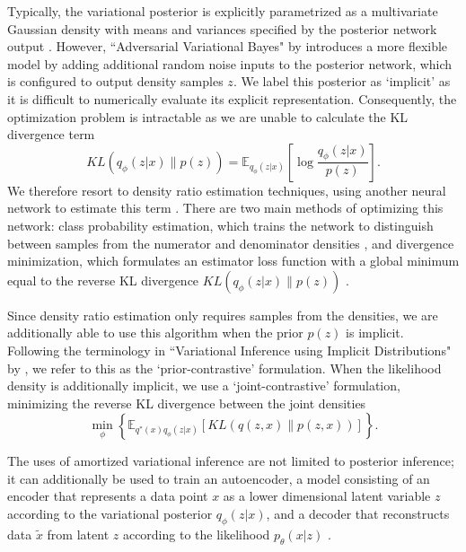 \documentclass[honours,12pt, twoside]{unswthesis}
\newcommand{\E}{\mathbb{E}}
\numberwithin{equation}{section}
\theoremstyle{definition}
\begin{document}
Typically, the variational posterior is explicitly parametrized as a multivariate Gaussian density with means and variances specified by the posterior network output \citep{kingma}. However, ``Adversarial Variational Bayes" by \citet{mescheder} introduces a more flexible model by adding additional random noise inputs to the posterior network, which is configured to output density samples $z$. We label this posterior as `implicit' as it is difficult to numerically evaluate its explicit representation. Consequently, the optimization problem is intractable as we are unable to calculate the KL divergence term\[KL(q_\phi(z|x)\|p(z))=\E_{q_\phi(z|x)}\left[\log \frac{q_\phi(z|x)}{p(z)}\right].\] We therefore resort to density ratio estimation techniques, using another neural network to estimate this term \citep{sugiyama, mohamed}. There are two main methods of optimizing this network: class probability estimation, which trains the network to distinguish between samples from the numerator and denominator densities \citep{gan}, and divergence minimization, which formulates an estimator loss function with a global minimum equal to the reverse KL divergence $KL(q_\phi(z|x)\|p(z))$ \citep{nguyen}.

Since density ratio estimation only requires samples from the densities, we are additionally able to use this algorithm when the prior $p(z)$ is implicit. Following the terminology in ``Variational Inference using Implicit Distributions" by \citet{huszar}, we refer to this as the `prior-contrastive' formulation. When the likelihood density is additionally implicit, we use a `joint-contrastive' formulation, minimizing the reverse KL divergence between the joint densities \citep{tran}
\[\min_\phi \left\lbrace\E_{q^*(x)q_\phi(z|x)}\left[KL(q(z,x)\|p(z,x))\right]\right\rbrace.\]

The uses of amortized variational inference are not limited to posterior inference; it can additionally be used to train an autoencoder, a model consisting of an encoder that represents a data point $x$ as a lower dimensional latent variable $z$ according to the variational posterior $q_\phi(z|x)$, and a decoder that reconstructs data $\tilde{x}$ from latent $z$ according to the likelihood $p_\theta(x|z)$ \citep{kingma}.
\end{document}
